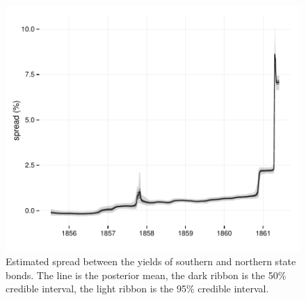 \documentclass[11pt, oneside, article]{memoir}\usepackage[]{graphicx}\usepackage[]{color}
\begin{document}
\begin{figure}
  \centerfloat
  \includegraphics{figures/fig_north_south_spreads-1}
\caption{
  Estimated spread between the yields of southern and northern state bonds.
  The line is the posterior mean, the dark ribbon is the 50\% credible interval, the light ribbon is the 95\% credible interval.
}
\label{fig:north_south_spreads}
\end{figure}
\end{document}
